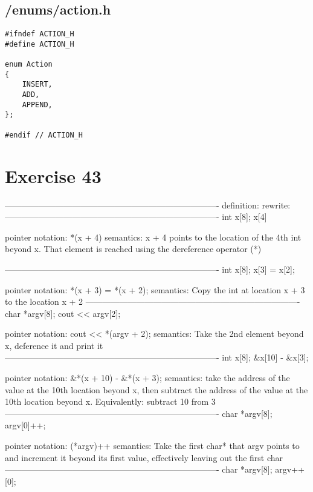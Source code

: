 \documentclass{article}
\begin{document}
\subsection*{/enums/action.h}
\begin{verbatim}
#ifndef ACTION_H
#define ACTION_H

enum Action
{
    INSERT,
    ADD,
    APPEND,
};

#endif // ACTION_H
\end{verbatim}


\section*{Exercise 43}
----------------------------------------------------------------------------
  definition:         rewrite: 
----------------------------------------------------------------------------
  int x[8];           x[4]            

pointer notation:  *(x + 4)
       semantics:  x + 4 points to the location of the 4th int beyond x.
                   That element is reached using the dereference operator (*)

----------------------------------------------------------------------------
  int x[8];           x[3] = x[2];

pointer notation:  *(x + 3) = *(x + 2);
       semantics:  Copy the int at location x + 3 to the location x + 2
----------------------------------------------------------------------------
  char *argv[8];      cout << argv[2];

pointer notation:  cout << *(argv + 2);
       semantics:  Take the 2nd element beyond x, deference it and print it
----------------------------------------------------------------------------
  int x[8];           &x[10] - &x[3];
 
pointer notation:  &*(x + 10) - &*(x + 3);
       semantics:  take the address of the value at the 10th location beyond
                   x, then subtract the address of the value at the 10th location beyond x.
                   Equivalently: subtract 10 from 3
----------------------------------------------------------------------------
  char *argv[8];      argv[0]++;

pointer notation:  (*argv)++
       semantics:  Take the first char* that argv points to and increment it
                   beyond its first value, effectively leaving out the first
                   char
----------------------------------------------------------------------------
  char *argv[8];      argv++[0];
\end{document}
